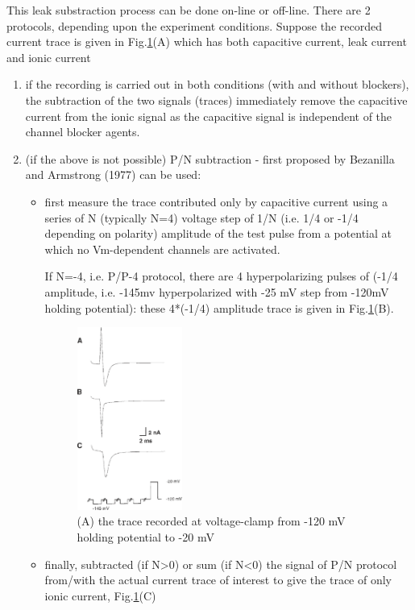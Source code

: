 This leak substraction process can be done on-line or off-line.
There are 2 protocols, depending upon the experiment conditions.
Suppose the recorded current trace is given in
Fig.\ref{fig:capacitive-n-leak-subtraction}(A) which has both capacitive
current, leak current and ionic current
\begin{enumerate}

  \item if the recording is carried out in both conditions (with and without
  blockers), the subtraction of the two signals (traces) immediately remove the
  capacitive current from the ionic signal as the capacitive signal is
  independent of the channel blocker agents.

  \item (if the above is not possible) P/N subtraction - first proposed by
  Bezanilla and Armstrong (1977) can be used:
  \begin{itemize}

    \item first measure the trace contributed only by capacitive
     current using a series of N (typically N=4) voltage step of 1/N
    (i.e. 1/4 or -1/4 depending on polarity) amplitude of the test pulse from a
    potential at which no Vm-dependent channels are activated.

If N=-4, i.e. P/P-4 protocol, there are 4 hyperpolarizing pulses of (-1/4
amplitude, i.e. -145mv hyperpolarized with -25 mV step from -120mV holding
potential): these 4*(-1/4) amplitude trace is given in
Fig.\ref{fig:capacitive-n-leak-subtraction}(B).



\begin{figure}[hbt]
  \centerline{\includegraphics[height=6cm,
    angle=0]{./images/capacitive-n-leak-subtraction.eps}}
  \caption{(A) the trace recorded at voltage-clamp from -120 mV holding
  potential to -20 mV}
\label{fig:capacitive-n-leak-subtraction}
\end{figure}

    \item finally, subtracted (if N>0) or sum (if N<0) the signal of P/N
    protocol from/with the actual current trace of interest to give the trace of
    only ionic current, Fig.\ref{fig:capacitive-n-leak-subtraction}(C)

  \end{itemize}
\end{enumerate}

